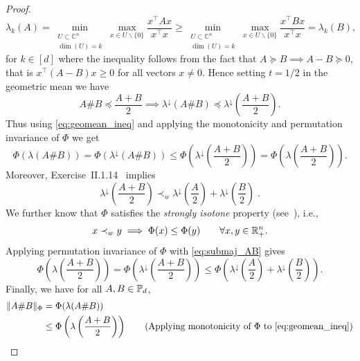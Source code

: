 \documentclass[sn-nature]{sn-jnl}%
\theoremstyle{thmstyleone}%
\theoremstyle{thmstyletwo}%
\theoremstyle{thmstylethree}%
\begin{document}
\begin{proof}
    \[
    \lambda_k(A)=\min _{\substack{U \subset \mathbb{C}^n \\ \operatorname{dim}(U)=k}} \max _{x \in U \backslash\{0\}} \frac{x^{\top} A x}{x^{\top} x} \geq \min _{\substack{U \subset \mathbb{C}^n \\ \operatorname{dim}(U)=k}} \max _{x \in U \backslash\{0\}} \frac{x^{\top} B x}{x^{\top} x}=\lambda_k(B),
    \]
    for $k \in [d]$ where the inequality follows from the fact that $A \succeq B \implies A-B \succeq 0$, that is $x^\top (A-B) x \geq 0$ for all vectors $x \neq 0$.
    Hence setting $t=1/2$ in the geometric mean we have 
    \begin{equation}\label{eq:geomean_ineq}
        A \# B \preceq \frac{A + B}{2} \implies \lambda^\downarrow(A \# B) \preceq \lambda^\downarrow \left( \frac{A+B}{2}\right).
    \end{equation}
    Thus using \eqref{eq:geomean_ineq} and applying the monotonicity and permutation invariance of $\Phi$ we get
    \[
    \Phi(\lambda(A \# B)) = \Phi(\lambda^\downarrow(A \# B)) \leq \Phi\left( \lambda^\downarrow \left( \frac{A+B}{2}  \right) \right) = \Phi\left( \lambda \left( \frac{A+B}{2}  \right) \right). 
    \]
    Moreover, Exercise~II.1.14~\cite{bhatia97} implies 
    \begin{equation}\label{eq:submaj_AB}
        \lambda^\downarrow \left(\frac{A+B}{2}\right) \prec_w \lambda^\downarrow \left(\frac{A}{2}\right) + \lambda^\downarrow \left(\frac{B}{2}\right) \; .
    \end{equation}
    We further know that $\Phi$ satisfies the \textit{strongly isotone} property (see~\cite[page~45]{bhatia97}), i.e., 
    \[
    x \prec_w y  \implies \Phi(x) \leq \Phi(y) \qquad \forall x,y \in \mathbb{R}_+^n.
    \]
    Applying permutation invariance of $\Phi$ with \eqref{eq:submaj_AB} gives
    \begin{equation}\label{eq:weak_maj}
        \Phi\left(\lambda\left(\frac{A+B}{2}\right) \right) = \Phi\left(\lambda^\downarrow \left(\frac{A+B}{2}\right) \right)  \leq \Phi\left(\lambda^\downarrow\left(\frac{A}{2}\right) + \lambda^\downarrow \left(\frac{B}{2}\right) \right).
    \end{equation}
    Finally, we have for all $A, B \in \mathbb{P}_d$,
    \begin{align*}
        \begin{split}
            \|A \# B\|_\Phi &= \Phi(\lambda(A \# B)) 
            \\& \leq \Phi\left(\lambda\left( \frac{A+B}{2}\right)\right) \qquad \text{(Applying monotonicity of } \Phi \text{ to \eqref{eq:geomean_ineq}})

\end{split}
\end{align*}
\end{proof}
\end{document}
